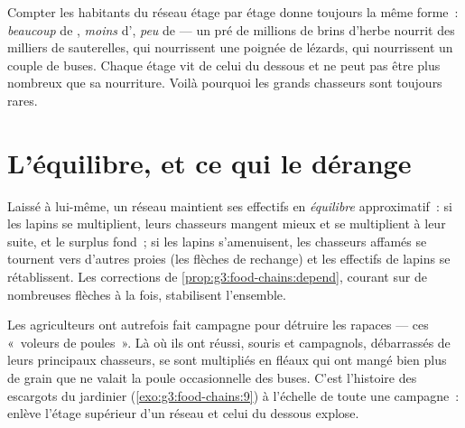 \begin{proposition}\label{prop:g5:food-webs:pyramid}
Compter les habitants du réseau étage par étage donne toujours la
même forme~: \emph{beaucoup} de , \emph{moins}
d', \emph{peu} de  --- un pré de millions de
brins d'herbe nourrit des milliers de sauterelles, qui nourrissent
une poignée de lézards, qui nourrissent un couple de buses. Chaque
étage vit de celui du dessous et ne peut pas être plus nombreux que
sa nourriture. Voilà pourquoi les grands chasseurs sont toujours
rares.
\end{proposition}
\admitted

\section{L'équilibre, et ce qui le dérange}

\begin{proposition}\label{prop:g5:food-webs:balance}
Laissé à lui-même, un réseau maintient ses effectifs en
\emph{équilibre}
approximatif~: si les lapins se multiplient, leurs chasseurs mangent
mieux et se multiplient à leur suite, et le surplus fond~; si les
lapins s'amenuisent, les chasseurs affamés se tournent vers d'autres
proies (les flèches de rechange) et les effectifs de lapins se
rétablissent. Les corrections de
\cref{prop:g3:food-chains:depend}, courant sur de nombreuses flèches
à la fois, stabilisent l'ensemble.
\end{proposition}
\admitted

\begin{example}\label{ex:g5:food-webs:mistake}
Les agriculteurs ont autrefois fait campagne pour détruire les
rapaces --- ces «~voleurs de poules~». Là où ils ont réussi, souris
et campagnols, débarrassés de leurs principaux chasseurs, se sont
multipliés en fléaux qui ont mangé bien plus de grain que ne valait
la poule occasionnelle des buses. C'est l'histoire des escargots du
jardinier (\cref{exo:g3:food-chains:9}) à l'échelle de toute une
campagne~: enlève l'étage supérieur d'un réseau et celui du dessous
explose.
\end{example}

